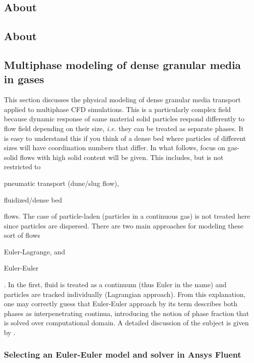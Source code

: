 \subsection{About \textcite{Ergun1952}}


\subsection{About \textcite{Gunn1978}} 


\subsection{Multiphase modeling of dense granular media in gases}

This section discusses the physical modeling of dense granular media transport applied to multiphase CFD simulations. This is a particularly complex field because dynamic response of same material solid particles respond differently to flow field depending on their size, \emph{i.e.} they can be treated as separate phases. It is easy to understand this if you think of a dense bed where particles of different sizes will have coordination numbers that differ. In what follows, focus on gas-solid flows with high solid content will be given. This includes, but is not restricted to \begin{inparaenum}[(i)] \item pneumatic transport (dune/slug flow), \item fluidized/dense bed \end{inparaenum} flows. The case of particle-laden (particles in a continuous gas) is not treated here since particles are dispersed. There are two main approaches for modeling these sort of flows \begin{inparaenum}[(i)] \item Euler-Lagrange, and \item Euler-Euler\end{inparaenum}. In the first, fluid is treated as a continuum (thus Euler in the name) and particles are tracked individually (Lagrangian approach). From this explanation, one may correctly guess that Euler-Euler approach by its term describes both phases as interpenetrating continua, introducing the notion of phase fraction that is solved over computational domain. A detailed discussion of the subject is given by \textcite{Crowe2011}.

\subsubsection{Selecting an Euler-Euler model and solver in Ansys Fluent}

